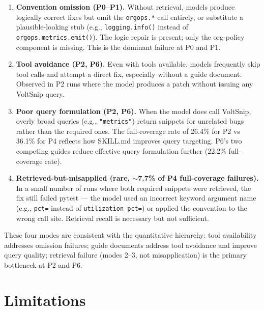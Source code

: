 \documentclass[10pt,a4paper,twocolumn]{article}
\begin{document}
\begin{enumerate}
    \item \textbf{Convention omission (P0--P1).} Without retrieval, models produce logically correct fixes but omit the \texttt{orgops.*} call entirely, or substitute a plausible-looking stub (e.g., \texttt{logging.info()} instead of \texttt{orgops.metrics.emit()}). The logic repair is present; only the org-policy component is missing. This is the dominant failure at P0 and P1.

    \item \textbf{Tool avoidance (P2, P6).} Even with tools available, models frequently skip tool calls and attempt a direct fix, especially without a guide document. Observed in P2 runs where the model produces a patch without issuing any VoltSnip query.

    \item \textbf{Poor query formulation (P2, P6).} When the model does call VoltSnip, overly broad queries (e.g., \texttt{"metrics"}) return snippets for unrelated bugs rather than the required ones. The full-coverage rate of 26.4\% for P2 vs 36.1\% for P4 reflects how SKILL.md improves query targeting. P6's two competing guides reduce effective query formulation further (22.2\% full-coverage rate).

    \item \textbf{Retrieved-but-misapplied (rare, $\sim$7.7\% of P4 full-coverage failures).} In a small number of runs where both required snippets were retrieved, the fix still failed pytest --- the model used an incorrect keyword argument name (e.g., \texttt{pct=} instead of \texttt{utilization\_pct=}) or applied the convention to the wrong call site. Retrieval recall is necessary but not sufficient.
\end{enumerate}

These four modes are consistent with the quantitative hierarchy: tool availability addresses omission failures; guide documents address tool avoidance and improve query quality; retrieval failure (modes 2--3, not misapplication) is the primary bottleneck at P2 and P6.

\section{Limitations}
\label{sec:limitations}
\end{document}
